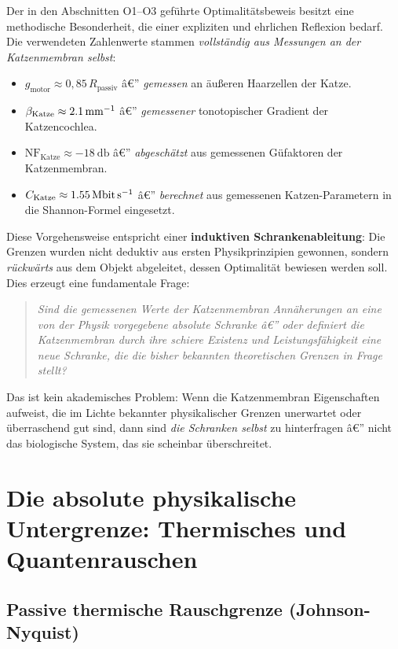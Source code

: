 ﻿\documentclass[12pt,a4paper,titlepage]{report}
\begin{document}
Der in den Abschnitten O1--O3 geführte Optimalitätsbeweis besitzt eine methodische
Besonderheit, die einer expliziten und ehrlichen Reflexion bedarf.
Die verwendeten Zahlenwerte stammen \emph{vollständig aus Messungen an der
Katzenmembran selbst}:
\begin{itemize}[leftmargin=2em]
  \item $g_{\text{motor}} \approx 0{,}85\,R_{\text{passiv}}$ â€” \emph{gemessen} an
    äußeren Haarzellen der Katze.
  \item $\beta_{\text{Katze}} \approx \SI{2{,}1}{\milli\meter^{-1}}$ â€”
    \emph{gemessener} tonotopischer Gradient der Katzencochlea.
  \item $\mathrm{NF}_{\text{Katze}} \approx \SI{-18}{\decibel}$ â€”
    \emph{abgeschätzt} aus gemessenen Güfaktoren der Katzenmembran.
  \item $C_{\text{Katze}} \approx \SI{1{,}55}{\mega\bit\per\second}$ â€”
    \emph{berechnet} aus gemessenen Katzen-Parametern in die Shannon-Formel eingesetzt.
\end{itemize}
Diese Vorgehensweise entspricht einer \textbf{induktiven Schrankenableitung}: Die
Grenzen wurden nicht deduktiv aus ersten Physikprinzipien gewonnen, sondern
\emph{rückwärts} aus dem Objekt abgeleitet, dessen Optimalität bewiesen werden soll.
Dies erzeugt eine fundamentale Frage:

\begin{quote}
  \itshape
  Sind die gemessenen Werte der Katzenmembran Annäherungen an eine von der Physik
  vorgegebene absolute Schranke â€” oder definiert die Katzenmembran
  durch ihre schiere Existenz und Leistungsfähigkeit eine neue Schranke,
  die die bisher bekannten theoretischen Grenzen in Frage stellt?
\end{quote}

Das ist kein akademisches Problem: Wenn die Katzenmembran Eigenschaften aufweist,
die im Lichte bekannter physikalischer Grenzen unerwartet oder überraschend gut sind,
dann sind \emph{die Schranken selbst} zu hinterfragen â€” nicht das biologische
System, das sie scheinbar überschreitet.

\section{Die absolute physikalische Untergrenze: Thermisches und
Quantenrauschen}

\subsection{Passive thermische Rauschgrenze (Johnson-Nyquist)}
\end{document}
